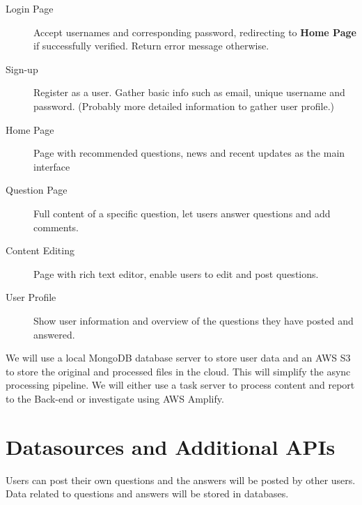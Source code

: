 \begin{description}
  \item[Login Page] Accept usernames and corresponding password, redirecting to \textbf{Home Page} if successfully verified. Return error message otherwise.
  \item[Sign-up] Register as a user. Gather basic info such as email, unique username and password. (Probably more detailed information to gather user profile.)
  \item[Home Page] Page with recommended questions, news and recent updates as the main interface
  \item [Question Page] Full content of a specific question, let users answer questions and add comments.
  \item [Content Editing] Page with rich text editor, enable users to edit and post questions.
  \item [User Profile] Show user information and overview of the questions they have posted and answered.
\end{description}
We will use a local MongoDB database server to store user data and an AWS S3 to store the original and processed files in the cloud.  This will simplify the async processing pipeline.
We will either use a task server to process content and report to the Back-end or investigate using AWS Amplify.

\section{Datasources and Additional APIs}

Users can post their own questions and the answers will be posted by other users. Data related to questions and answers will be stored in databases. 

